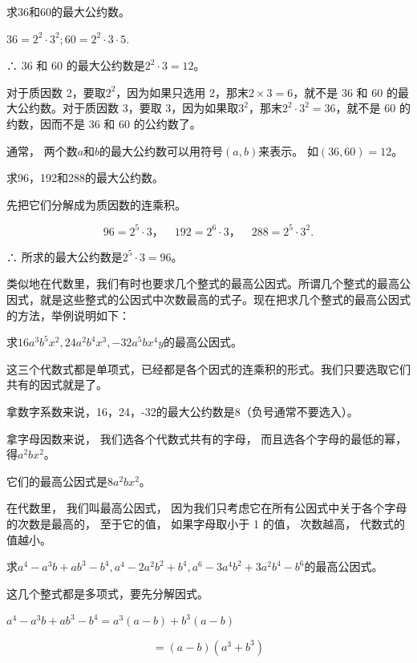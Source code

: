  求36和60的最大公约数。

\(36 = 2^{2} \cdot 3^{2}; 60 = 2^{2} \cdot 3 \cdot 5.\)

∴ 36 和 60 的最大公约数是\(2^{2} \cdot 3 = 12\)。

 对于质因数 2，要取\(2^{2}\)，因为如果只选用
2，那末\(2 \times 3 = 6\)，就不是 36 和 60 的最大公约数。对于质因数
3，要取 3，因为如果取\(3^{2}\)，那末\(2^{2} \cdot 3^{2} = 36\)，就不是
60 的约数，因而不是 36 和 60 的公约数了。

通常， 两个数\(a\)和\(b\)的最大公约数可以用符号\((a, b)\)来表示。
如\((36, 60) = 12\)。

 求96，192和288的最大公约数。

 先把它们分解成为质因数的连乘积。

\[
96 = 2 ^{5} \cdot 3\text{，} \quad 192 = 2 ^{6} \cdot 3\text{，} \quad 288 = 2 ^{5} \cdot 3 ^{2}.
\]

∴ 所求的最大公约数是\(2^{5} \cdot 3 = 96\)。

类似地在代数里，我们有时也要求几个整式的最高公因式。所谓几个整式的最高公因式，就是这些整式的公因式中次数最高的式子。现在把求几个整式的最高公因式的方法，举例说明如下：

求\(16a^{3}b^{5}x^{2}, 24a^{2}b^{4}x^{3}, -32a^{5}bx^{4}y\)的最高公因式。

这三个代数式都是单项式，已经都是各个因式的连乘积的形式。我们只要选取它们共有的因式就是了。

拿数字系数来说，16，24，-32的最大公约数是8（负号通常不要选入）。

拿字母因数来说， 我们选各个代数式共有的字母， 而且选各个字母的最低的幂，
得\(a^2 b x^2\)。

 它们的最高公因式是\(8a^{2}b x^{2}\)。

 在代数里， 我们叫最高公因式，
因为我们只考虑它在所有公因式中关于各个字母的次数是最高的， 至于它的值，
如果字母取小于 1 的值， 次数越高， 代数式的值越小。

求\(a^{4}-a^{3}b+ab^{3}-b^{4}, a^{4}-2a^{2}b^{2}+b^{4}, a^{6}-3a^{4}b^{2}+3a^{2}b^{4}-b^{6}\)的最高公因式。

 这几个整式都是多项式，要先分解因式。

\(a^4 - a^3 b + ab^3 - b^4 = a^3 (a - b) + b^3 (a - b)\)

\[
= (a - b) \left(a ^{3} + b ^{3}\right)
\]

